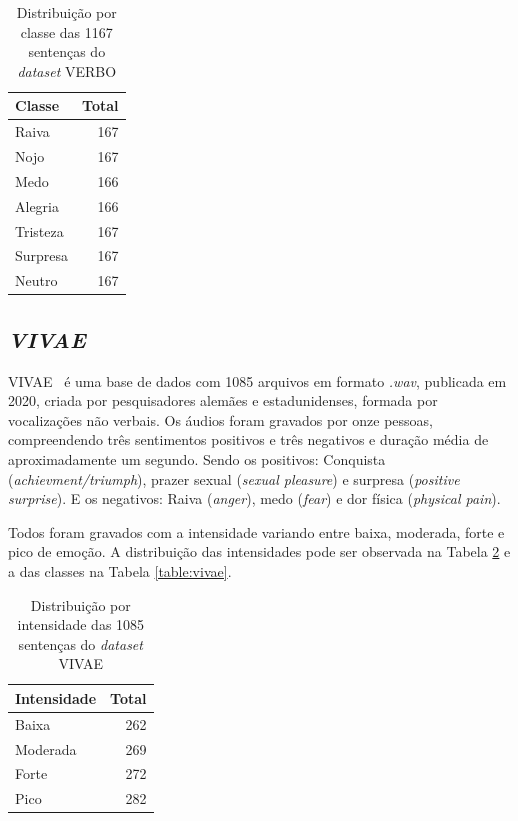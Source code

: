 \begin{table}[]
\centering
\caption{Distribuição por classe das 1167 sentenças do \textit{dataset} VERBO}
    \begin{tabular}{|l|r|}
    \hline
        Classe & Total \\ \hline
        Raiva & 167  \\ \hline
        Nojo & 167  \\ \hline
        Medo & 166  \\ \hline
        Alegria & 166  \\ \hline
        Tristeza & 167  \\ \hline
        Surpresa & 167  \\ \hline
        Neutro & 167  \\ \hline
    \end{tabular}\label{table:verbo}
\end{table}

\subsection{\textit{VIVAE}}\label{subsection:vivae}

\acrlong{VIVAE}~\cite{16} é uma base de dados com 1085 arquivos em formato \textit{.wav}, publicada em 2020, criada por pesquisadores alemães e estadunidenses, formada por vocalizações não verbais. Os áudios foram gravados por onze pessoas, compreendendo três sentimentos positivos e três negativos e duração média de aproximadamente um segundo. Sendo os positivos: Conquista (\textit{achievment/triumph}), prazer sexual (\textit{sexual pleasure}) e surpresa (\textit{positive surprise}). E os negativos: Raiva (\textit{anger}), medo (\textit{fear}) e dor física (\textit{physical pain}).

Todos foram gravados com a intensidade variando entre baixa, moderada, forte e pico de emoção. A distribuição das intensidades pode ser observada na Tabela \ref{table:vivaeintensidade} e a das classes na Tabela \ref{table:vivae}.

\begin{table}[]
    \centering
    \caption{Distribuição por intensidade das 1085 sentenças do \textit{dataset} VIVAE}
    \begin{tabular}{|l|r|}
    \hline
        Intensidade & Total  \\ \hline
        Baixa & 262  \\ \hline
        Moderada & 269  \\ \hline
        Forte & 272  \\ \hline
        Pico & 282  \\ \hline
    \end{tabular}\label{table:vivaeintensidade}
\end{table}


